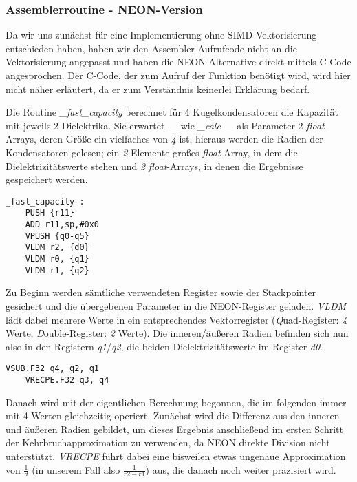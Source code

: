 \documentclass[11pt]{scrartcl}
\begin{document}
\subsubsection{Assemblerroutine - NEON-Version}

Da wir uns zunächst für eine Implementierung ohne SIMD-Vektorisierung entschieden haben, haben wir den Assembler-Aufrufcode nicht an die Vektorisierung angepasst und haben die NEON-Alternative direkt mittels C-Code angesprochen. Der C-Code, der zum Aufruf der Funktion benötigt wird, wird hier nicht näher erläutert, da er zum Verständnis keinerlei Erklärung bedarf.

Die Routine \emph{\_fast\_capacity} berechnet für 4 Kugelkondensatoren die Kapazität mit jeweils 2 Dielektrika. Sie erwartet --- wie \emph{\_calc} --- als Parameter 2 \emph{float}-Arrays, deren Größe ein vielfaches von \emph{4} ist, hieraus werden die Radien der Kondensatoren gelesen; ein \emph{2} Elemente großes \emph{float}-Array, in dem die Dielektrizitätswerte stehen und \emph{2} \emph{float}-Arrays, in denen die Ergebnisse gespeichert werden.
\\
\begin{lstlisting}[language={[x86masm]Assembler}]
_fast_capacity :
	PUSH {r11}
	ADD r11,sp,#0x0
	VPUSH {q0-q5}
	VLDM r2, {d0}
	VLDM r0, {q1}
	VLDM r1, {q2}
\end{lstlisting}
Zu Beginn werden sämtliche verwendeten Register sowie der Stackpointer gesichert und die übergebenen Parameter in die NEON-Register geladen. \emph{VLDM} lädt dabei mehrere Werte in ein entsprechendes Vektorregister (\emph{Q}uad-Register: \emph{4} Werte, \emph{D}ouble-Register: \emph{2} Werte). Die inneren/äußeren Radien befinden sich nun also in den Registern \emph{q1}/\emph{q2}, die beiden Dielektrizitätswerte im Register \emph{d0}.
\\
\begin{lstlisting}[language={[x86masm]Assembler}]
	VSUB.F32 q4, q2, q1
	VRECPE.F32 q3, q4
\end{lstlisting}
Danach wird mit der eigentlichen Berechnung begonnen, die im folgenden immer mit 4 Werten gleichzeitig operiert. Zunächst wird die Differenz aus den inneren und äußeren Radien gebildet, um dieses Ergebnis anschließend im ersten Schritt der Kehrbruchapproximation zu verwenden, da NEON direkte Division nicht unterstützt. \emph{VRECPE} führt dabei eine bisweilen etwas ungenaue Approximation von $\frac{1}{d}$ (in unserem Fall also $\frac{1}{r2-r1}$) aus, die danach noch weiter präzisiert wird.
\\
\end{document}
